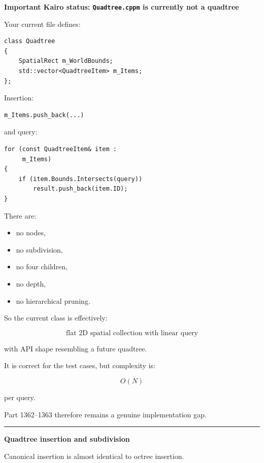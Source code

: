 \textbf{Important Kairo status: \texttt{Quadtree.cppm} is currently not a quadtree}

Your current file defines:

\begin{verbatim}
class Quadtree
{
    SpatialRect m_WorldBounds;
    std::vector<QuadtreeItem> m_Items;
};
\end{verbatim}

Insertion:

\begin{verbatim}
m_Items.push_back(...)
\end{verbatim}

and query:

\begin{verbatim}
for (const QuadtreeItem& item :
     m_Items)
{
    if (item.Bounds.Intersects(query))
        result.push_back(item.ID);
}
\end{verbatim}

There are:

\begin{itemize}
\tightlist
\item
  no nodes,
\item
  no subdivision,
\item
  no four children,
\item
  no depth,
\item
  no hierarchical pruning.
\end{itemize}

So the current class is effectively:

\[
\boxed{
\text{flat 2D spatial collection with linear query}
}
\]

with API shape resembling a future quadtree.

It is correct for the test cases, but complexity is:

\[
O(N)
\]

per query.

Part 1362--1363 therefore remains a genuine implementation gap.

\begin{center}\rule{0.5\linewidth}{0.5pt}\end{center}

\textbf{Quadtree insertion and subdivision}

Canonical insertion is almost identical to octree insertion.

